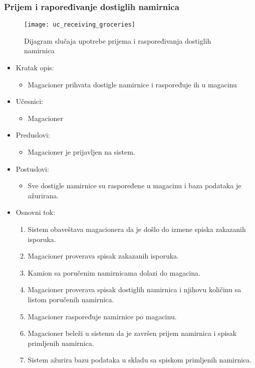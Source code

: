 
\subsubsection{Prijem i rapoređivanje dostiglih namirnica}
\begin{figure}[H]
	\begin{center}
		\texttt{[image: uc\_receiving\_groceries]}
		\caption{Dijagram slučaja upotrebe prijema i raspoređivanja dostiglih namirnica}
	\end{center}
\end{figure}
	\begin{itemize}
		\item{Kratak opis:} 
		\begin{itemize}
			\item{Magacioner prihvata dostigle namirnice i raspoređuje ih u magacinu}
		\end{itemize}
		\item{Učesnici:} 
		\begin{itemize}
			\item{Magacioner}
		\end{itemize}		
		
		\item{Preduslovi:}
		\begin{itemize}
			\item{Magacioner je prijavljen na sistem.}
		\end{itemize}
		
		\item{Postuslovi:}
		\begin{itemize}
			\item{Sve dostigle namirnice su raspoređene u magacinu i baza podataka je ažurirana.}
		\end{itemize}
		
		\item{Osnovni tok:}
		\begin{enumerate}
			\item{Sistem obaveštava magacionera da je došlo do izmene spiska zakazanih isporuka.}
			\item{Magacioner proverava spisak zakazanih isporuka.}
			\item{Kamion sa poručenim namirnicama dolazi do magacina.}
			\item{Magacioner proverava spisak dostiglih namirnica i njihovu količinu sa listom poručenih namirnica.}
			\item{Magacioner raspoređuje namirnice po magacinu.}
			\item{Magacioner beleži u sistemu da je završen prijem namirnica i spisak primljenih namirnica.}
			\item{Sistem ažurira bazu podataka u skladu sa spiskom primljenih namirnica.}
		\end{enumerate}
		

\end{itemize}
